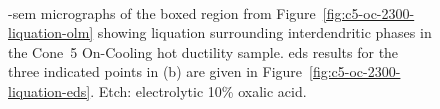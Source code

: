 {\begin{figure}
    \centering
     \\
    \caption{-\gls{sem} micrographs of the boxed region from Figure~\ref{fig:c5-oc-2300-liquation-olm} showing liquation surrounding interdendritic phases in the Cone~5 On-Cooling \protect{} hot ductility sample. \gls{eds} results for the three indicated points in (b) are given in Figure~\ref{fig:c5-oc-2300-liquation-eds}. Etch: electrolytic 10\% oxalic acid.}
    \label{fig:c5-oc-2300-liquation-sem}
\end{figure}

}
